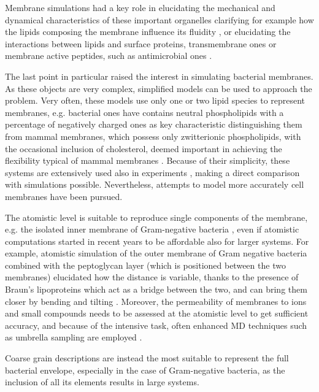 \documentclass[graybox]{svmult}
\begin{document}
Membrane simulations had a key role in elucidating the mechanical and dynamical characteristics of these important organelles clarifying for example how the lipids composing the membrane influence its fluidity \cite{Risselada2008,Song2019}, or elucidating the interactions between lipids and surface proteins, transmembrane ones or membrane active peptides, such as antimicrobial ones \cite{Leontiadou2006,Ulmschneider2017,Sun2015}.

The last point in particular raised the interest in simulating bacterial membranes. As these objects are very complex, simplified models can be used to approach the problem.
%
Very often, these models use only one or two lipid species to represent membranes, e.g. bacterial ones have contains neutral phospholipids with a percentage of negatively charged ones \cite{Lipkin2017,Wang2012,Zhao2018,Chen2019} as key characteristic distinguishing them from mammal membranes, which possess only zwitterionic phospholipids, with the occasional inclusion of cholesterol, deemed important in achieving the flexibility typical of mammal membranes \cite{Lipkin2017,Wang2012,Zhao2018,Chen2019,Risselada2008}.
%
Because of their simplicity, these systems are extensively used also in experiments \cite{Castelletto2016,Tang2009,Glukhov2005}, making a direct comparison with simulations possible. Nevertheless, attempts to model more accurately cell membranes have been pursued.

The atomistic level is suitable to reproduce single components of the membrane, e.g. the isolated inner membrane of Gram-negative bacteria \cite{Piggot2011}, even if atomistic computations started in recent years to be affordable also for larger systems.
%
For example, atomistic simulation of the outer membrane of Gram negative bacteria combined with the peptoglycan layer (which is positioned between the two membranes) elucidated how the distance is variable, thanks to the presence of Braun's lipoproteins which act as a bridge between the two, and can bring them closer by bending and tilting \cite{Samsudin2017}.
%
Moreover, the permeability of membranes to ions and small compounds needs to be assessed at the atomistic level to get sufficient accuracy, and because of the intensive task, often enhanced MD techniques such as umbrella sampling are employed \cite{Carpenter2016}.

Coarse grain descriptions are instead the most suitable to represent the full bacterial envelope, especially in the case of Gram-negative bacteria, as the inclusion of all its elements results in large systems.
\end{document}
